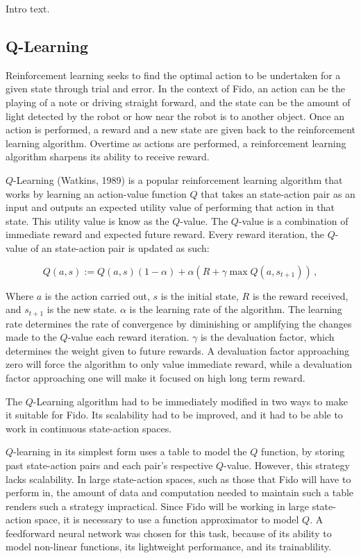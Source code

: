 Intro text.

\subsection{Q-Learning}

Reinforcement learning seeks to find the optimal action to be undertaken for a given state through trial and error. In the context of Fido, an action can be the playing of a note or driving straight forward, and the state can be the amount of light detected by the robot or how near the robot is to another object. Once an action is performed, a reward and a new state are given back to the reinforcement learning algorithm. Overtime as actions are performed, a reinforcement learning algorithm sharpens its ability to receive reward.

$Q$-Learning (Watkins, 1989) is a popular reinforcement learning algorithm that works by learning an action-value function $Q$ that takes an state-action pair as an input and outputs an expected utility value of performing that action in that state. This utility value is know as the $Q$-value. The $Q$-value is a combination of immediate reward and expected future reward. Every reward iteration, the $Q$-value of an state-action pair is updated as such:

\begin{equation}
	Q(a, s) := Q(a, s)(1 - \alpha) + \alpha(R + \gamma \max Q(a, s_{t+1}))
	\,,
\end{equation}

Where $a$ is the action carried out, $s$ is the initial state, $R$ is the reward received, and $s_{t+1}$ is the new state. $\alpha$ is the learning rate of the algorithm. The learning rate determines the rate of convergence by diminishing or amplifying the changes made to the $Q$-value each reward iteration. $\gamma$ is the devaluation factor, which determines the weight given to future rewards. A devaluation factor approaching zero will force the algorithm to only value immediate reward, while a devaluation factor approaching one will make it focused on high long term reward.

The $Q$-Learning algorithm had to be immediately modified in two ways to make it suitable for Fido. Its scalability had to be improved, and it had to be able to work in continuous state-action spaces.

$Q$-learning in its simplest form uses a table to model the $Q$ function, by storing past state-action pairs and each pair's respective $Q$-value. However, this strategy lacks scalability. In large state-action spaces, such as those that Fido will have to perform in, the amount of data and computation needed to maintain such a table renders such a strategy impractical. Since Fido will be working in large state-action space, it is necessary to use a function approximator to model $Q$. A feedforward neural network was chosen for this task, because of its ability to model non-linear functions, its lightweight performance, and its trainablility.

